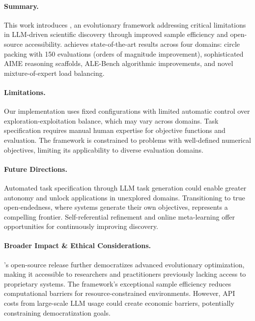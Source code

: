 \paragraph{Summary.}
This work introduces \ouralgo, an evolutionary framework addressing critical limitations in LLM-driven scientific discovery through improved sample efficiency and open-source accessibility.
\ouralgo achieves state-of-the-art results across four domains: circle packing with 150 evaluations (orders of magnitude improvement), sophisticated AIME reasoning scaffolds, ALE-Bench algorithmic improvements, and novel mixture-of-expert load balancing.
%
\paragraph{Limitations.}
Our implementation uses fixed configurations with limited automatic control over exploration-exploitation balance, which may vary across domains.
Task specification requires manual human expertise for objective functions and evaluation.
The framework is constrained to problems with well-defined numerical objectives, limiting its applicability to diverse evaluation domains.
%
\paragraph{Future Directions.}
Automated task specification through LLM task generation could enable greater autonomy and unlock applications in unexplored domains.
Transitioning to true open-endedness, where systems generate their own objectives, represents a compelling frontier.
Self-referential refinement and online meta-learning offer opportunities for continuously improving discovery.
%
\paragraph{Broader Impact \& Ethical Considerations.}
\ouralgo's open-source release further democratizes advanced evolutionary optimization, making it accessible to researchers and practitioners previously lacking access to proprietary systems.
The framework's exceptional sample efficiency reduces computational barriers for resource-constrained environments.
However, API costs from large-scale LLM usage could create economic barriers, potentially constraining democratization goals.